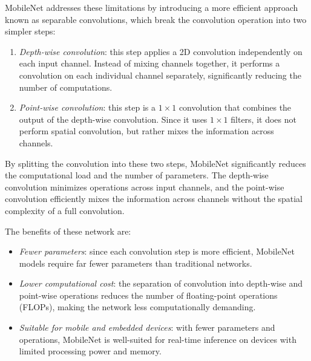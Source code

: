 MobileNet addresses these limitations by introducing a more efficient approach known as separable convolutions, which break the convolution operation into two simpler steps:
\begin{enumerate}
    \item \textit{Depth-wise convolution}: this step applies a 2D convolution independently on each input channel. 
        Instead of mixing channels together, it performs a convolution on each individual channel separately, significantly reducing the number of computations.
    \item \textit{Point-wise convolution}: this step is a $1\times 1$ convolution that combines the output of the depth-wise convolution. 
        Since it uses $1\times 1$ filters, it does not perform spatial convolution, but rather mixes the information across channels.
\end{enumerate}
By splitting the convolution into these two steps, MobileNet significantly reduces the computational load and the number of parameters. 
The depth-wise convolution minimizes operations across input channels, and the point-wise convolution efficiently mixes the information across channels without the spatial complexity of a full convolution.

The benefits of these network are: 
\begin{itemize}
    \item \textit{Fewer parameters}: since each convolution step is more efficient, MobileNet models require far fewer parameters than traditional networks.
    \item \textit{Lower computational cost}: the separation of convolution into depth-wise and point-wise operations reduces the number of floating-point operations (FLOPs), making the network less computationally demanding.
    \item \textit{Suitable for mobile and embedded devices}: with fewer parameters and operations, MobileNet is well-suited for real-time inference on devices with limited processing power and memory.
\end{itemize}

